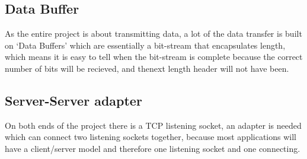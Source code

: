 \subsection{Data Buffer}
As the entire project is about transmitting data, a lot of the data transfer is built on `Data Buffers' which are essentially a bit-stream that encapsulates length, which means it is easy to tell when the bit-stream is complete because the correct number of bits will be recieved, and thenext length header will not have been.

\subsection{Server-Server adapter}
On both ends of the project there is a TCP listening socket, an adapter is needed which can connect two listening sockets together, because most applications will have a client/server model and therefore one listening socket and one connecting.
